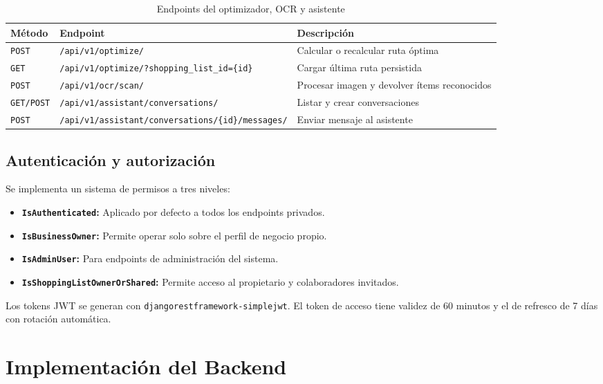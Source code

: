 \begin{table}[h]
\caption{Endpoints del optimizador, OCR y asistente}
\label{tab:api-core}
\centering
\begin{tabular}{|l|p{6cm}|p{5cm}|}
\hline
\textbf{M\'etodo} & \textbf{Endpoint} & \textbf{Descripci\'on} \\
\hline
\texttt{POST} & \texttt{/api/v1/optimize/} & Calcular o recalcular ruta \'optima \\
\texttt{GET} & \texttt{/api/v1/optimize/?shopping\_list\_id=\{id\}} &
  Cargar \'ultima ruta persistida \\
\texttt{POST} & \texttt{/api/v1/ocr/scan/} &
  Procesar imagen y devolver \'items reconocidos \\
\texttt{GET/POST} & \texttt{/api/v1/assistant/conversations/} &
  Listar y crear conversaciones \\
\texttt{POST} & \texttt{/api/v1/assistant/conversations/\{id\}/messages/} &
  Enviar mensaje al asistente \\
\hline
\end{tabular}
\end{table}

\subsection{Autenticaci\'on y autorizaci\'on}\label{subsec:api-auth}

Se implementa un sistema de permisos a tres niveles:

\begin{itemize}
  \item \textbf{\texttt{IsAuthenticated}:} Aplicado por defecto a todos los endpoints privados.
  \item \textbf{\texttt{IsBusinessOwner}:} Permite operar solo sobre el perfil de negocio propio.
  \item \textbf{\texttt{IsAdminUser}:} Para endpoints de administraci\'on del sistema.
  \item \textbf{\texttt{IsShoppingListOwnerOrShared}:} Permite acceso al propietario y
    colaboradores invitados.
\end{itemize}

Los tokens JWT se generan con \texttt{djangorestframework-simplejwt}. El token de acceso tiene
validez de 60 minutos y el de refresco de 7 d\'ias con rotaci\'on autom\'atica.

\section{Implementaci\'on del Backend}\label{sec:implementacion-backend}


